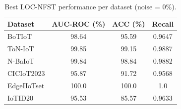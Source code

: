 \begin{table}[!ht]
\centering
\caption{Best LOC-NFST performance per dataset (noise = 0\%).}
\begin{tabular}{lccc}
\hline
\textbf{Dataset} & \textbf{AUC-ROC} (\%) & \textbf{ACC} (\%) & \textbf{Recall} \\
\hline
BoTIoT & 98.64 & 95.59 & 0.9647 \\
ToN-IoT & 99.85 & 99.15 & 0.9887 \\
N-BaIoT & 99.84 & 98.84 & 0.9882 \\
CICIoT2023 & 95.87 & 91.72 & 0.9568 \\
EdgeIIoTset & 100.0 & 100.0 & 1.0 \\
IoTID20 & 95.53 & 85.57 & 0.9633 \\
\hline
\end{tabular}
\label{tab:best_results}
\end{table}